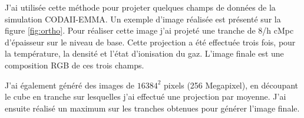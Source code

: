 

J'ai utilisée cette méthode pour projeter quelques champs de données de la simulation CODAII-EMMA.
Un exemple d'image réalisée est présenté sur la figure \ref{fig:ortho}.
Pour réaliser cette image j'ai projeté une tranche de 8/h cMpc d'épaisseur sur le niveau de base.
Cette projection a été effectuée trois fois, pour la température, la densité et l'état d'ionisation du gaz.
L'image finale est une composition \ac{RGB} de ces trois champs.

J'ai également généré des images de $16384^2$ pixels (256 Megapixel), en découpant le cube en tranche sur lesquelles j'ai effectué une projection par moyenne.
J'ai ensuite réalisé un maximum sur les tranches obtenues pour générer l'image finale.



